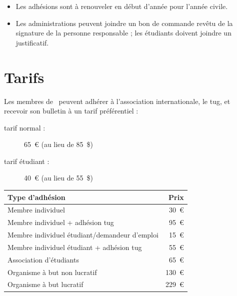 \begin{itemize}
\item %
  Les adhésions sont à renouveler  en début d'année
  pour l'année civile.
\item Les administrations peuvent joindre un bon de commande
  revêtu de la signature de la personne responsable ;
  les étudiants doivent joindre un justificatif.
\end{itemize}

\vspace*{-0.7cm}
\section{Tarifs \the\year}

Les membres de \gut\ peuvent adhérer à l'association
internationale, le \acf{tug}, et recevoir son bulletin
\tugboat{} à un tarif préférentiel :
\begin{description}
\item[tarif normal :] 65~€ (au lieu de 85~\$)
\item[tarif étudiant :] 40~€ (au lieu de 55~\$)
\end{description}

\footnotesize
\begin{center}
  \begin{tabular}{lr}
    \toprule
    \textbf{Type d'adhésion}                        & \textbf{Prix} \\
    \midrule
    Membre individuel                               & 30~€      \\
    Membre individuel + adhésion \acs{tug}          & 95~€      \\
    Membre individuel étudiant/demandeur d'emploi   & 15~€      \\
    Membre individuel étudiant + adhésion \acs{tug} & 55~€      \\
    Association d'étudiants                         & 65~€      \\
    Organisme à but non lucratif                    & 130~€     \\
    Organisme à but lucratif                        & 229~€     \\
    \bottomrule
  \end{tabular}
\end{center}

